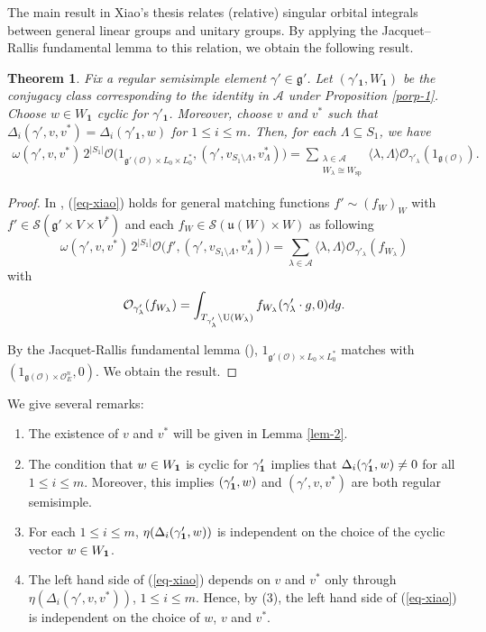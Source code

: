 \documentclass[a4paper]{amsart}
\newcommand{\CA}{{\mathcal {A}}} \newcommand{\CB}{{\mathcal {B}}}
\newcommand{\CO}{{\mathcal {O}}} \newcommand{\CP}{{\mathcal {P}}}
\newcommand{\CS}{{\mathcal {S}}} \newcommand{\CT}{{\mathcal {T}}}
\newcommand{\RU}{{\mathrm {U}}} \newcommand{\RV}{{\mathrm {V}}}
\newcommand{\fg}{{\mathfrak{g}}} \newcommand{\fh}{{\mathfrak{h}}}
\newcommand{\fu}{{\mathfrak{u}}} \newcommand{\fv}{{\mathfrak{v}}}
\theoremstyle{plain}
\newtheorem{thm}{Theorem}[section] \newtheorem{cor}[thm]{Corollary}
\theoremstyle{remark} \newtheorem{remark}[thm]{Remark}
\theoremstyle{exercise} \newtheorem{exercise}[thm]{Exercise}
\theoremstyle{example} \newtheorem{example}[thm]{Example}
\theoremstyle{question} \newtheorem{question}[thm]{Question}
\theoremstyle{assumption} \newtheorem{assumption}[thm]{Assumption}
\numberwithin{equation}{section}
\renewcommand{\sp}{{\mathrm{sp}}}
\begin{document}
The  main result in Xiao's thesis \cite[Theorem 3.12]{Xia19}   relates  (relative) singular orbital integrals  between  general linear groups and unitary groups. By applying the Jacquet--Rallis fundamental lemma to this relation, we obtain the following result.

\begin{thm}\label{thm-xiao-general}
    Fix a regular semisimple element
$\gamma'\in\fg'$. Let $(\gamma'_\mathbf 1,W_{\mathbf 1})$ be the conjugacy class corresponding to the identity in $\CA$ under Proposition \ref{porp-1}. Choose $w\in W_{\mathbf 1}$ cyclic for $\gamma'_{\mathbf 1}$. Moreover, choose $v$ and $v^*$ such that $\Delta_i(\gamma',v,v^*)=\Delta_i(\gamma'_{\mathbf 1},w)$ for $1 \leq i \leq m$. Then, for each $\Lambda\subseteq S_1$, we have
\begin{align}\label{eq-xiao}
    \omega(\gamma',v,v^*)\,2^{|S_1|}
\CO \big(1_{\fg'(\CO)\times L_0\times L_0^*},(\gamma',v_{S_1\setminus\Lambda},v^*_\Lambda)\big)
=
\sum_{\substack{\lambda\in\mathcal A\\W_\lambda\cong W_\sp}}
\langle\lambda,\Lambda\rangle
\CO_{\gamma'_{\lambda}}(1_{\fg(\CO)}).
\end{align}

\end{thm}
\begin{proof}
    In \cite[Theorem 3.12]{Xia19}, (\ref{eq-xiao}) holds
    for general matching functions $f' \sim (f_W)_W$ with
    $f' \in \CS(\fg' \times V \times V^*)$ and each $f_W \in \CS(\fu(W) \times W)$ as following
    \[ \omega(\gamma',v,v^*)\,2^{|S_1|}
\CO \big(f',(\gamma',v_{S_1\setminus\Lambda},v^*_\Lambda)\big)
=
\sum_{\lambda\in \CA}
\langle\lambda,\Lambda\rangle
\CO_{\gamma'_{\lambda}}(f_{W_\lambda})\]
with
\[\CO_{\gamma'_{\lambda}}(f_{W_\lambda}) = 
\int_{T_{\gamma'_\lambda} \bs \RU(W_\lambda)} f_{W_\lambda}(\gamma'_\lambda \cdot g,0) dg.\]
    
By the Jacquet-Rallis fundamental lemma (\cite[Theorem 2.10]{Xia19}), 
$1_{\fg'(\CO)\times L_0\times L_0^*}$  matches with
$(1_{\fg(\CO) \times \CO_E^n},0)$. We obtain the result.
\end{proof}

We give several remarks:
\begin{enumerate}
    \item The existence of $v$ and $v^*$ will be given in Lemma \ref{lem-2}.
    \item The condition that $w \in W_{\bf 1}$ is cyclic for $\gamma_{\bf 1}'$
    implies that $\Delta_i(\gamma_{\bf 1}',w) \not=0$ for all $1 \leq i \leq m$. Moreover, this implies $(\gamma_{\bf 1}',w)$ and $(\gamma',v,v^*)$ are both regular semisimple.
    \item For each $1 \leq i \leq m$, $\eta(\Delta_i(\gamma_{\bf 1}',w))$ is independent on the choice of the cyclic vector $w \in W_{\bf 1}$.
    \item The left hand side of (\ref{eq-xiao}) depends on
    $v$ and $v^*$ only through $\eta(\Delta_i(\gamma',v,v^*))$, $1 \leq i \leq m$. Hence, by (3),  the left hand side
     of (\ref{eq-xiao}) is independent on the choice of $w$, $v$ and $v^*$.
\end{enumerate}
\end{document}
